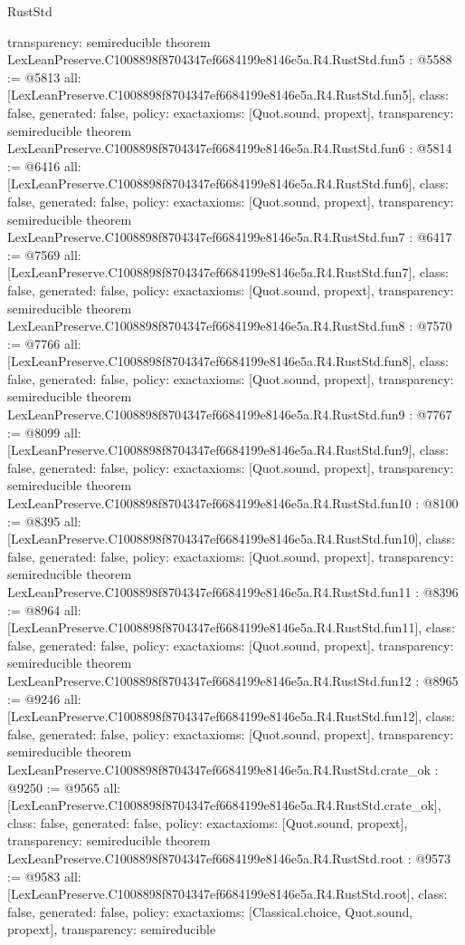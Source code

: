 \begin{lexlean}{RustStd}
\begin{coremodule}
{  transparency: semireducible
}
theorem LexLeanPreserve.C1008898f8704347ef6684199e8146e5a.R4.RustStd.fun5 : @5588 := @5813 {
  all: [LexLeanPreserve.C1008898f8704347ef6684199e8146e5a.R4.RustStd.fun5],
  class: false,
  generated: false,
  policy: exact{axioms: [Quot.sound, propext]},
  transparency: semireducible
}
theorem LexLeanPreserve.C1008898f8704347ef6684199e8146e5a.R4.RustStd.fun6 : @5814 := @6416 {
  all: [LexLeanPreserve.C1008898f8704347ef6684199e8146e5a.R4.RustStd.fun6],
  class: false,
  generated: false,
  policy: exact{axioms: [Quot.sound, propext]},
  transparency: semireducible
}
theorem LexLeanPreserve.C1008898f8704347ef6684199e8146e5a.R4.RustStd.fun7 : @6417 := @7569 {
  all: [LexLeanPreserve.C1008898f8704347ef6684199e8146e5a.R4.RustStd.fun7],
  class: false,
  generated: false,
  policy: exact{axioms: [Quot.sound, propext]},
  transparency: semireducible
}
theorem LexLeanPreserve.C1008898f8704347ef6684199e8146e5a.R4.RustStd.fun8 : @7570 := @7766 {
  all: [LexLeanPreserve.C1008898f8704347ef6684199e8146e5a.R4.RustStd.fun8],
  class: false,
  generated: false,
  policy: exact{axioms: [Quot.sound, propext]},
  transparency: semireducible
}
theorem LexLeanPreserve.C1008898f8704347ef6684199e8146e5a.R4.RustStd.fun9 : @7767 := @8099 {
  all: [LexLeanPreserve.C1008898f8704347ef6684199e8146e5a.R4.RustStd.fun9],
  class: false,
  generated: false,
  policy: exact{axioms: [Quot.sound, propext]},
  transparency: semireducible
}
theorem LexLeanPreserve.C1008898f8704347ef6684199e8146e5a.R4.RustStd.fun10 : @8100 := @8395 {
  all: [LexLeanPreserve.C1008898f8704347ef6684199e8146e5a.R4.RustStd.fun10],
  class: false,
  generated: false,
  policy: exact{axioms: [Quot.sound, propext]},
  transparency: semireducible
}
theorem LexLeanPreserve.C1008898f8704347ef6684199e8146e5a.R4.RustStd.fun11 : @8396 := @8964 {
  all: [LexLeanPreserve.C1008898f8704347ef6684199e8146e5a.R4.RustStd.fun11],
  class: false,
  generated: false,
  policy: exact{axioms: [Quot.sound, propext]},
  transparency: semireducible
}
theorem LexLeanPreserve.C1008898f8704347ef6684199e8146e5a.R4.RustStd.fun12 : @8965 := @9246 {
  all: [LexLeanPreserve.C1008898f8704347ef6684199e8146e5a.R4.RustStd.fun12],
  class: false,
  generated: false,
  policy: exact{axioms: [Quot.sound, propext]},
  transparency: semireducible
}
theorem LexLeanPreserve.C1008898f8704347ef6684199e8146e5a.R4.RustStd.crate_ok : @9250 := @9565 {
  all: [LexLeanPreserve.C1008898f8704347ef6684199e8146e5a.R4.RustStd.crate_ok],
  class: false,
  generated: false,
  policy: exact{axioms: [Quot.sound, propext]},
  transparency: semireducible
}
theorem LexLeanPreserve.C1008898f8704347ef6684199e8146e5a.R4.RustStd.root : @9573 := @9583 {
  all: [LexLeanPreserve.C1008898f8704347ef6684199e8146e5a.R4.RustStd.root],
  class: false,
  generated: false,
  policy: exact{axioms: [Classical.choice, Quot.sound, propext]},
  transparency: semireducible
}


\end{coremodule}
\end{lexlean}
